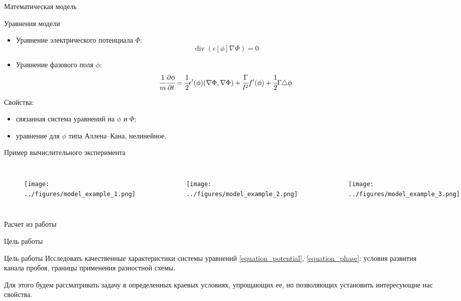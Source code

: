 \documentclass[aspectratio=169]{beamer}
\DeclareMathOperator{\Div}{div}
\begin{document}
\begin{frame}{Математическая модель}
\vspace{-0.5cm}
\begin{block}{Уравнения модели}
\begin{itemize}
	\item Уравнение электрического потенциала $\Phi$:
	\begin{equation}
		\Div(\epsilon[\phi] \nabla \Phi) = 0
		\label{equation_potential}
	\end{equation}
	\item Уравнение фазового поля $\phi$:
	\begin{equation}
		\cfrac{1}{m} \cfrac{\partial \phi}{\partial t} = \cfrac{1}{2} \epsilon'(\phi)
		(\nabla \Phi, \nabla \Phi) + \cfrac{\Gamma}{l^2} f'(\phi) +
		\cfrac{1}{2} \Gamma \triangle \phi
		\label{equation_phase}
	\end{equation}
\end{itemize}
\end{block}
Свойства:
\begin{itemize}
	\item связанная система уравнений на $\phi$ и $\Phi$;
	\item уравнение для $\phi$ типа Аллена--Кана, нелинейное.
\end{itemize}
\end{frame}


\begin{frame}{Пример вычислительного эксперимента}
\begin{columns}
\begin{figure}
	\texttt{[image: ../figures/model\_example\_1.png]}
\end{figure}
\begin{figure}
	\texttt{[image: ../figures/model\_example\_2.png]}
\end{figure}
\begin{figure}
	\texttt{[image: ../figures/model\_example\_3.png]}
\end{figure}
\end{columns}
\begin{center}
	Расчет из работы \cite{zipunova_experiment}
\end{center}
\end{frame}


\begin{frame}{Цель работы}
\begin{block}{Цель работы}
	Исследовать качественные характеристики системы уравнений \eqref{equation_potential},
	\eqref{equation_phase}: условия развития канала пробоя, границы применения разностной
	схемы.
\end{block}
Для этого будем рассматривать задачу в определенных краевых условиях, упрощающих ее, но
позволяющих установить интересующие нас свойства.
\end{frame}
\end{document}
